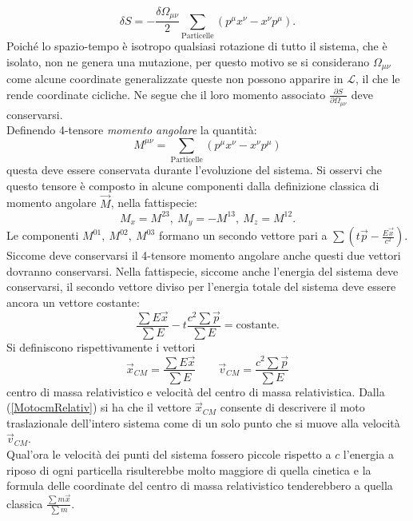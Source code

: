 \begin{equation*}
    \delta S=-\frac{\delta \Omega_{\mu \nu}}{2}\sum_{\text{Particelle}}(p^\mu x^\nu-x^\nu p^\mu).
\end{equation*}
Poiché lo spazio-tempo è isotropo qualsiasi rotazione di tutto il sistema, che è isolato, non ne genera una mutazione, per questo motivo se si considerano $\Omega_{\mu\nu}$ come alcune coordinate generalizzate queste non possono apparire in $\mathcal{L} $, il che le rende coordinate cicliche. Ne segue che il loro momento associato $\frac{\partial S}{\partial\Omega_{\mu \nu}}$ deve conservarsi.\\Definendo 4-tensore \emph{momento angolare} la quantità:
\begin{equation}
    M^{\mu\nu}=\sum_{\text{Particelle}}(p^\mu x^\nu-x^\nu p^\mu )
\end{equation}
questa deve essere conservata durante l'evoluzione del sistema. Si osservi che questo tensore è composto in alcune componenti dalla definizione classica di momento angolare $\vec{M}$, nella fattispecie:
\begin{equation*}
    M_x=M^{23},\ M_y=-M^{13},\ M_z=M^{12}.
\end{equation*}
Le componenti $M^{01},\ M^{02},\ M^{03}$ formano un secondo vettore pari a $\sum(t\vec{p}-\frac{E\vec{x}}{c^2})$. Siccome deve conservarsi il 4-tensore momento angolare anche questi due vettori dovranno conservarsi. Nella fattispecie, siccome anche l'energia del sistema deve conservarsi, il secondo vettore diviso per l'energia totale del sistema deve essere ancora un vettore costante:
\begin{equation}
    \frac{\sum E \vec{x}}{\sum E}- t\frac{c^2\sum\vec{p}}{\sum E}=\text{costante}.\label{MotocmRelativ}
\end{equation}
Si definiscono rispettivamente i vettori
\begin{equation}
    \vec x_{CM}=\frac{\sum E \vec{x}}{\sum E} \qquad \vec v_{CM}=\frac{c^2\sum\vec{p}}{\sum E}\label{cmRelativ}
\end{equation}
centro di massa relativistico e velocità del centro di massa relativistica. Dalla (\ref{MotocmRelativ}) si ha che il vettore $\vec x_{CM}$ consente di descrivere il moto traslazionale dell'intero sistema come di un solo punto che si muove alla velocità $\vec v_{CM}$.\\
 Qual'ora le velocità dei punti del sistema fossero piccole rispetto a $c$ l'energia a riposo di ogni particella risulterebbe molto maggiore di quella cinetica e la formula delle coordinate del centro di massa relativistico tenderebbero a quella classica $\frac{\sum m\vec{x}}{\sum m}$. 
